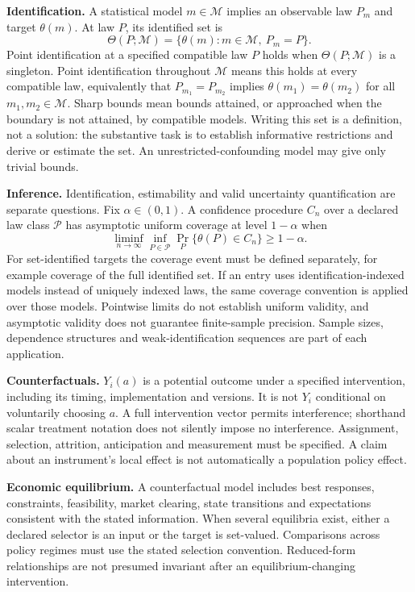 \documentclass[11pt,a4paper]{article}
\begin{document}
\textbf{Identification.} A statistical model $m\in\mathcal M$ implies an observable law $P_m$ and target $\theta(m)$. At law $P$, its identified set is
\[
\Theta(P;\mathcal M)=\{\theta(m):m\in\mathcal M,\ P_m=P\}.
\]
Point identification at a specified compatible law $P$ holds when $\Theta(P;\mathcal M)$ is a singleton. Point identification throughout $\mathcal M$ means this holds at every compatible law, equivalently that $P_{m_1}=P_{m_2}$ implies $\theta(m_1)=\theta(m_2)$ for all $m_1,m_2\in\mathcal M$. Sharp bounds mean bounds attained, or approached when the boundary is not attained, by compatible models. Writing this set is a definition, not a solution: the substantive task is to establish informative restrictions and derive or estimate the set. An unrestricted-confounding model may give only trivial bounds.

\textbf{Inference.} Identification, estimability and valid uncertainty quantification are separate questions. Fix $\alpha\in(0,1)$. A confidence procedure $C_n$ over a declared law class $\mathcal P$ has asymptotic uniform coverage at level $1-\alpha$ when
\[
\liminf_{n\to\infty}\inf_{P\in\mathcal P}\Pr_P\{\theta(P)\in C_n\}\geq1-\alpha.
\]
For set-identified targets the coverage event must be defined separately, for example coverage of the full identified set. If an entry uses identification-indexed models instead of uniquely indexed laws, the same coverage convention is applied over those models. Pointwise limits do not establish uniform validity, and asymptotic validity does not guarantee finite-sample precision. Sample sizes, dependence structures and weak-identification sequences are part of each application.

\textbf{Counterfactuals.} $Y_i(a)$ is a potential outcome under a specified intervention, including its timing, implementation and versions. It is not $Y_i$ conditional on voluntarily choosing $a$. A full intervention vector permits interference; shorthand scalar treatment notation does not silently impose no interference. Assignment, selection, attrition, anticipation and measurement must be specified. A claim about an instrument's local effect is not automatically a population policy effect.

\textbf{Economic equilibrium.} A counterfactual model includes best responses, constraints, feasibility, market clearing, state transitions and expectations consistent with the stated information. When several equilibria exist, either a declared selector is an input or the target is set-valued. Comparisons across policy regimes must use the stated selection convention. Reduced-form relationships are not presumed invariant after an equilibrium-changing intervention.
\end{document}
